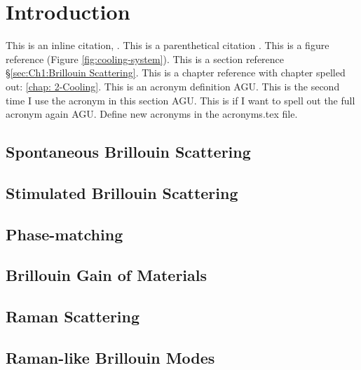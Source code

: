 \chapter{Introduction}
\label{ch:Introduction}
\acresetall

This is an inline citation, \cite{boyd2020nonlinear}. This is a parenthetical citation \citep{boyd2020nonlinear}. This is a figure reference (Figure \ref{fig:cooling-system}). This is a section reference \S\ref{sec:Ch1:Brillouin Scattering}. This is a chapter reference with chapter spelled out: \autoref{chap: 2-Cooling}. This is an acronym definition \ac{AGU}. This is the second time I use the acronym in this section \ac{AGU}. This is if I want to spell out the full acronym again \acf{AGU}. Define new acronyms in the acronyms.tex file.


\section{Spontaneous Brillouin Scattering}
\label{sec:Introduction:Spontaneous}
\lipsum[1]

\section{Stimulated Brillouin Scattering}
\label{sec:Introduction:Stimulated}
\lipsum[1]

\section{Phase-matching}
\label{sec:Introduction:Phase-matching}
\lipsum[1]

\section{Brillouin Gain of Materials}
\label{subsec:Introduction:Gain}

\section{Raman Scattering}
\label{sec:Introduction:Raman}
\lipsum[1]

\section{Raman-like Brillouin Modes}
\label{sec:Introduction:Raman-like}
\lipsum[1]
